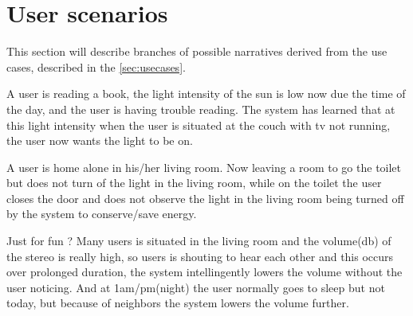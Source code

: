 \section{User scenarios}\label{sec:userscenarious}


This section will describe branches of possible narratives derived from the use cases, described in the \cref{sec:usecases}.

A user is reading a book, the light intensity of the sun is low now due the time of the day, and the user is having trouble reading. The system has learned that at this light intensity when the user is situated at the couch with tv not running, the user now wants the light to be on.

A user is home alone in his/her living room. Now leaving a room to go the toilet but does not turn of the light in the living room, while on the toilet the user closes the door and does not observe the light in the living room being turned off by the system to conserve/save energy.

Just for fun ? Many users is situated in the living room and the volume(db) of the stereo is really high, so users is shouting to hear each other and this occurs over prolonged duration, the system intellingently lowers the volume without the user noticing. And at 1am/pm(night) the user normally goes to sleep but not today, but because of neighbors the system lowers the volume further.

